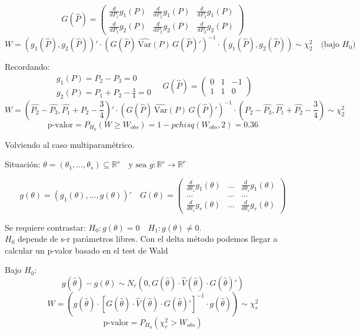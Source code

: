 \[
G(\widehat{P})=
\begin{pmatrix}
    \frac{d}{d P_1} g_1(P) & \frac{d}{d P_2} g_1(P) & \frac{d}{d P_3} g_1(P) \\
    \frac{d}{d P_1} g_2(P) & \frac{d}{d P_2} g_2(P) & \frac{d}{d P_3} g_2(P) 
\end{pmatrix}
\]
\[
W = \left( g_1(\widehat{P}), g_2(\widehat{P}) \right)' \cdot \left( G(\widehat{P}) \, \widehat{\text{Var}}(P) \, G(\widehat{P})' \right)^{-1} \cdot \left( g_1(\widehat{P}), g_2(\widehat{P}) \right) \sim \chi^2_2 \quad \text{(bajo } H_0\text{)}
\]

Recordando:   
\[
\begin{matrix}
    g_1(P)=P_2-P_3=0 \\
    g_2(P)=P_1+P_2-\frac{3}{4}=0
\end{matrix}
\quad
G(\widehat{P})=
\begin{pmatrix}
    0 & 1 & -1\\
    1 & 1 & 0
\end{pmatrix}
\]
\[
W = \left( \widehat{P_2}-\widehat{P_3}, \widehat{P_1}+\widehat{P_2}-\frac{3}{4} \right)' \cdot \left( G(\widehat{P}) \, \widehat{\text{Var}}(P) \, G(\widehat{P})' \right)^{-1} \cdot 
\left(  \widehat{P_2}-\widehat{P_3}, \widehat{P_1}+\widehat{P_2}-\frac{3}{4} \right) \sim \chi^2_2 
\]
\[
\text{p-valor}=P_{H_0}(W \geq W_{obs})=1-pchisq(W_{obs},2)=0.36
\]

Volviendo al caso multiparamétrico.

Situación: $\theta=(\theta_1,\dots,\theta_s) \subseteq \mathbb{R}^s \quad \text{y sea }g:\mathbb{R^s}\to \mathbb{R}^r$

\[
g(\theta)=(g_1(\theta),\dots,g(\theta))'
\quad G(\theta)=
\begin{pmatrix}
    \frac{d}{d \theta_1} g_1(\theta) & \dots &  \frac{d}{d \theta_s} g_1(\theta) \\
    \dots & \dots & \dots \\
    \frac{d}{d \theta_1} g_r(\theta) & \dots &  \frac{d}{d \theta_s} g_r(\theta)
\end{pmatrix}
\]

Se requiere contrastar: $H_0:g(\theta)=0 \quad H_1:g(\theta) \neq 0$.
\\ $H_0$ depende de s-r parámetros libres. Con el delta método podemos llegar a calcular un p-valor basado en el test de Wald

Bajo $H_0$:
\[
g(\widehat{\theta})-g(\theta) \sim N_r(0,G(\widehat{\theta})\cdot \widehat{V}(\widehat{\theta})\cdot G(\widehat{\theta})')
\]
\[
W=(g(\widehat{\theta})\cdot [G(\widehat{\theta})\cdot \widehat{V}(\widehat{\theta})\cdot G(\widehat{\theta})']^{-1} \cdot g(\widehat{\theta})) \sim \chi^2_r
\]
\[
\text{p-valor}=P_{H_0}(\chi^2_r>W_{obs})
\]

